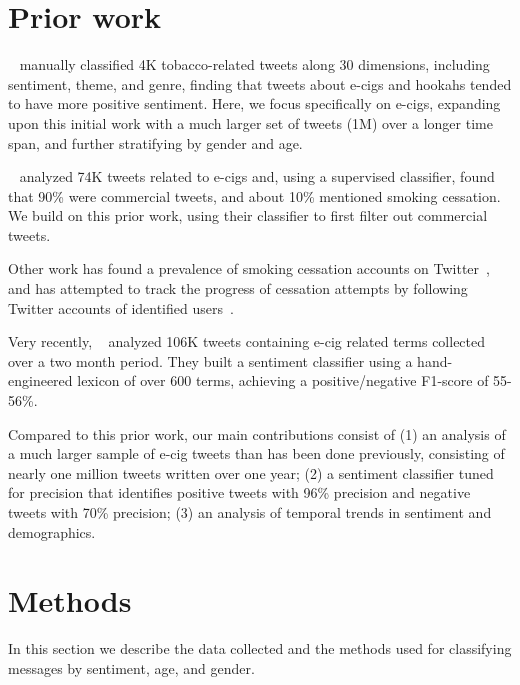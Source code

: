 \documentclass{sig-alternate}
\newcommand{\citenoun}[1]{{\citeauthor{#1}~\cite{#1}}}
\begin{document}
\section{Prior work}
\label{s.prior}

\citenoun{myslin2013using} manually classified 4K tobacco-related tweets
along 30 dimensions, including sentiment, theme, and genre, finding that
tweets about e-cigs and hookahs tended to have more positive sentiment. Here,
we focus specifically on e-cigs, expanding upon this initial work with a much
larger set of tweets (1M) over a longer time span, and further
stratifying by gender and age.

\citenoun{huang2014cross} analyzed 74K tweets related to e-cigs and,
using a supervised classifier, found that 90\% were commercial tweets, and
about 10\% mentioned smoking cessation. We build on this prior work, using
their classifier to first filter out commercial tweets.

Other work has found a prevalence of smoking cessation accounts on
Twitter~\cite{prochaska2012twitter}, and has attempted to track the progress
of cessation attempts by following Twitter accounts of identified
users~\cite{murnane2014unraveling}.

Very recently, \citenoun{godea2015analysis} analyzed 106K tweets containing
e-cig related terms collected over a two month period. They built a sentiment
classifier using a hand-engineered lexicon of over 600 terms, achieving a
positive/negative F1-score of 55-56\%.

Compared to this prior work, our main contributions consist of (1) an analysis
of a much larger sample of e-cig tweets than has been done previously,
consisting of nearly one million tweets written over one year; (2) a sentiment
classifier tuned for precision that identifies positive tweets with 96\%
precision and negative tweets with 70\% precision; (3) an analysis of temporal
trends in sentiment and demographics.

\section{Methods}
\label{s.methods}

In this section we describe the data collected and the methods used for classifying messages by sentiment, age, and gender.
\end{document}
